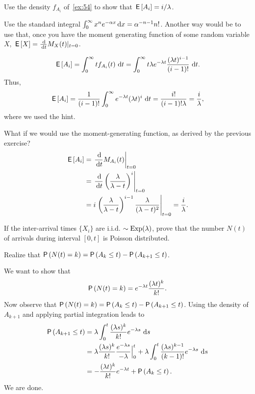\begin{extra}
  Use the density $f_{A_i}$ of~\cref{ex:54} to show that $\,\mathsf{E}\left[A_i\right]=i/\lambda$. 
\begin{hint}
Use the standard integral 
    $\int_0^\infty x^n e^{-\alpha x} \,\text{d}x =
    \alpha^{-n-1}n!$. 
    Another way would be to use that, once you have the moment
    generating function of some random variable $X$,
    $\E X = \frac{\d}{\d t} M_X(t) |_{t=0}$. 
\end{hint}
\begin{solution}
  \begin{equation*}
\,\mathsf{E}\left[A_i\right] = \int_0^\infty t f_{A_i} (t) \, \,\text{d}t  = 
\int_0^\infty t  \lambda e^{-\lambda t} \frac{(\lambda t)^{i-1}}{(i-1)!}\, \,\text{d}t.
  \end{equation*}
Thus, 
  \begin{equation*}
\,\mathsf{E}\left[A_i\right] = \frac{1}{(i-1)!} \int_0^\infty   e^{-\lambda t} (\lambda t)^i\,\,\text{d}t = \frac{i!}{(i-1)!\lambda}=\frac{i}\lambda,
  \end{equation*}
  where we used the hint.

What if we would use the moment-generating function, as derived by the previous exercise?
\begin{align*}
    \E{A_i} 
&= \left.\frac{\d}{\d t} M_{A_i}(t)\right|_{t=0} \\
&= \left.\frac{\d}{\d t} \left(\frac{\lambda}{\lambda-t}\right)^i\right|_{t=0} \\
&= i \left.\left(\frac{\lambda}{\lambda-t}\right)^{i-1}\frac{\lambda}{(\lambda-t)^2}\right|_{t=0} 
= \frac i\lambda.
\end{align*}


\end{solution}
\end{extra}

\begin{exercise}
  If the inter-arrival times $\{X_i\}$ are i.i.d.
  $\sim \operatorname{Exp}(\lambda)$, prove that the number $N(t)$ of arrivals during interval $[0,t]$ is Poisson distributed.
\begin{hint}
  Realize that
    $\P{N(t)=k} = \P{A_k \leq t} - \P{A_{k+1} \leq t}$.
\end{hint}
\begin{solution}
      We want to show that
    \begin{equation*}
      \P{N(t)=k} = e^{-\lambda t}\frac{(\lambda t)^k}{k!}.
    \end{equation*}
    Now observe that $\P{N(t)=k} = \P{A_k \leq t} - \P{A_{k+1} \leq t}$.
    Using the density of $A_{k+1}$ and applying partial integration leads to
\begin{align*}
\P{A_{k+1} \leq t} 
&= \lambda \int_0^t \frac{(\lambda s)^{k}}{k!}e^{-\lambda s}\, \d s \\
&= \lambda \frac{(\lambda s)^{k}}{k!}\frac{e^{-\lambda s}}{-\lambda} \Big|_{0}^t + \lambda \int_0^t \frac{(\lambda s)^{k-1}}{(k-1)!}e^{-\lambda s}\, \d s \\
&= - \frac{(\lambda t)^{k}}{k!} e^{-\lambda t} + \P{A_k \leq t}.
\end{align*}
We are done.
\end{solution}
\end{exercise}

